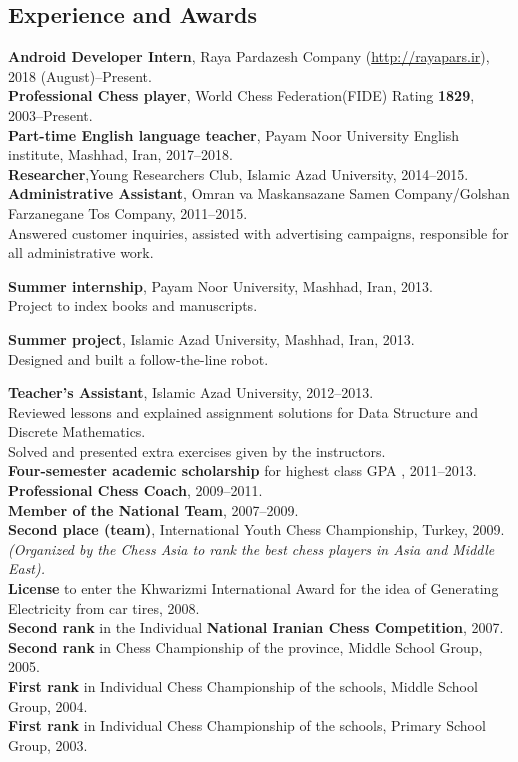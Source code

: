\documentclass[10pt]{article}
\begin{document}
\subsection*{Experience and Awards}
\textbf {Android Developer Intern}, Raya Pardazesh Company (\url{http://rayapars.ir}), 2018 (August)--Present.\\
\noindent\textbf {Professional Chess player},  World Chess Federation(FIDE) Rating\textbf{ 1829}, 2003--Present.\\
\textbf {Part-time English language teacher}, Payam Noor University English institute, Mashhad, Iran, 2017--2018.\\
\noindent\textbf {Researcher},Young Researchers Club, Islamic Azad University, 2014--2015.\\
\noindent\textbf{Administrative Assistant}, Omran va Maskansazane Samen Company/Golshan Farzanegane Tos Company, 2011--2015.\\
\indent Answered customer inquiries, assisted with advertising campaigns, responsible for all administrative work.

\noindent\textbf{Summer internship}, Payam Noor University, Mashhad, Iran, 2013.\\
\indent Project to index books and manuscripts.

\noindent\textbf{Summer project}, Islamic Azad University, Mashhad, Iran, 2013.\\
\indent Designed and built a follow-the-line robot.

\noindent\textbf{Teacher’s Assistant}, Islamic Azad University, 2012--2013.\\
\indent Reviewed lessons and explained assignment solutions for Data Structure and Discrete Mathematics.\\
\indent Solved and presented extra exercises given by the instructors.\\
\textbf{Four-semester academic scholarship} for highest class GPA , 2011--2013.\\
\noindent\textbf {Professional Chess Coach}, 2009--2011.\\
\noindent\textbf {Member of the National Team}, 2007--2009.\\
\textbf{Second place (team)}, International Youth Chess Championship, Turkey, 2009.\\ \indent \textit {(Organized by the Chess Asia to rank the best chess players in Asia and Middle East).} \\
\noindent\textbf {License }to enter the Khwarizmi International Award for the idea of Generating Electricity from car tires, 2008.\\
\textbf{Second rank} in the Individual \textbf{National Iranian Chess Competition}, 2007.\\
\textbf{Second rank} in Chess Championship of the province, Middle School Group, 2005.\\
\textbf{First rank} in Individual Chess Championship of the schools, Middle School Group, 2004.\\
\textbf{First rank} in Individual Chess Championship of the schools, Primary School Group, 2003.
\end{document}
